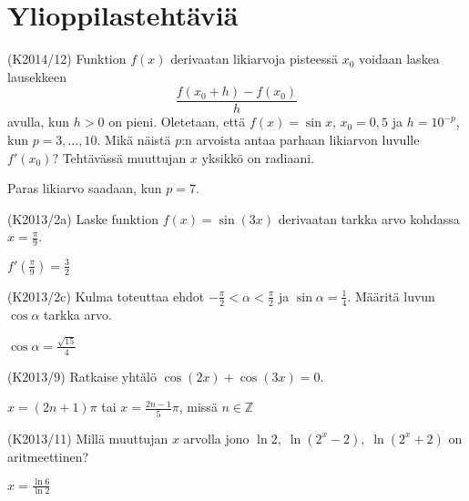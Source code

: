\section{Ylioppilastehtäviä}


\begin{tehtava} (K2014/12)
	Funktion $f(x)$ derivaatan likiarvoja pisteessä $x_0$ voidaan laskea lausekkeen 
	\[\frac{f(x_0+h)-f(x_0)}{h}\] avulla, kun $h>0$ on pieni. Oletetaan, että $f(x)=\sin x$, 
	$x_0=0,5$ ja $h=10^{-p}$, kun $p=3,\ldots,10$. Mikä näistä $p$:n arvoista antaa parhaan 
	likiarvon luvulle $f'(x_0)$? Tehtävässä muuttujan $x$ yksikkö on radiaani.
		\begin{vastaus}
			Paras likiarvo saadaan, kun $p=7$. 
		\end{vastaus}
\end{tehtava}

\begin{tehtava} (K2013/2a)
	Laske funktion $f(x)=\sin(3x)$ derivaatan tarkka arvo kohdassa $x=\frac{\pi}{9}$.
		\begin{vastaus}
			$f'(\frac{\pi}{9})=\frac{3}{2}$
		\end{vastaus}
\end{tehtava}

\begin{tehtava} (K2013/2c)
	Kulma \alpha toteuttaa ehdot $-\frac{\pi}{2}<\alpha<\frac{\pi}{2}$ ja $\sin\alpha=\frac{1}{4}$.
	Määritä luvun $\cos\alpha$ tarkka arvo.
		\begin{vastaus}
			$\cos\alpha=\frac{\sqrt{15}}{4}$
		\end{vastaus}
\end{tehtava}

\begin{tehtava} (K2013/9)
	Ratkaise yhtälö $\cos(2x)+\cos(3x)=0$.
		\begin{vastaus}
			$x=(2n+1)\pi$ tai $x=\frac{2n-1}{5}\pi$, missä $n\in\mathbb{Z}$
		\end{vastaus}
\end{tehtava}

\begin{tehtava} (K2013/11)
	Millä muuttujan $x$ arvolla jono $\ln2, \; \ln(2^x-2), \; \ln(2^x+2)$ on aritmeettinen?
		\begin{vastaus}
			$x=\frac{\ln6}{\ln2}$
		\end{vastaus}
\end{tehtava}

